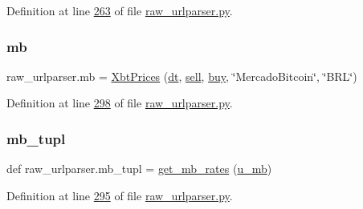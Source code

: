 Definition at line \hyperlink{raw__urlparser_8py_source_l00263}{263} of file \hyperlink{raw__urlparser_8py_source}{raw\+\_\+urlparser.\+py}.

\mbox{\label{namespaceraw__urlparser_a76acf8d303c15079b0560eace3e9720f}} 
\subsubsection{\texorpdfstring{mb}{mb}}
{\footnotesize\ttfamily raw\+\_\+urlparser.\+mb = \hyperlink{classraw__urlparser_1_1_xbt_prices}{Xbt\+Prices} (\hyperlink{namespaceraw__urlparser_acbaf2eef75f4aa43e1f6659c0fd34836}{dt}, \hyperlink{namespaceraw__urlparser_a9f1ba2a5cd520bb41ac4bee751047679}{sell}, \hyperlink{namespaceraw__urlparser_a2b9c66c8d5157cd95ecb738719c8a873}{buy}, \char`\"{}Mercado\+Bitcoin\char`\"{}, \char`\"{}B\+RL\char`\"{})}



Definition at line \hyperlink{raw__urlparser_8py_source_l00298}{298} of file \hyperlink{raw__urlparser_8py_source}{raw\+\_\+urlparser.\+py}.

\mbox{\label{namespaceraw__urlparser_a5d0646d42075b7bea171f53c46c3c938}} 
\subsubsection{\texorpdfstring{mb\+\_\+tupl}{mb\_tupl}}
{\footnotesize\ttfamily def raw\+\_\+urlparser.\+mb\+\_\+tupl = \hyperlink{namespaceraw__urlparser_ae2341143e866401a993a5a964610f7a6}{get\+\_\+mb\+\_\+rates} (\hyperlink{namespaceraw__urlparser_a9a840f174b92a24c415b88c87e84b73d}{u\+\_\+mb})}



Definition at line \hyperlink{raw__urlparser_8py_source_l00295}{295} of file \hyperlink{raw__urlparser_8py_source}{raw\+\_\+urlparser.\+py}.

\mbox{\label{namespaceraw__urlparser_adb426668060d85f4fbd24135e258a8b3}} 
